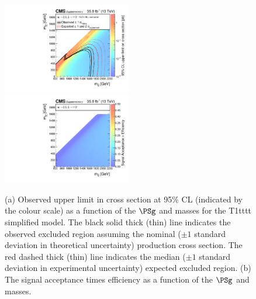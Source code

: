 \begin{figure}
    \begin{center}
            \includegraphics[width=0.50\textwidth]{Supplementary/T1ttttXSEC}
            \includegraphics[width=0.50\textwidth]{Supplementary/T1tttt_efficiency_aux}
        \caption{ (a) Observed upper limit in cross section at 95\% CL (indicated
        by the colour scale) as a function of 
        the $\PSg$ and \PSGczDo %
        masses for the 
        T1tttt %
        simplified  model.  The  black  solid thick  (thin)  line indicates  the
        observed  excluded  region  assuming   the  nominal  (${\pm}1$  standard
        deviation in theoretical uncertainty)  production cross section. The red
        dashed  thick  (thin)  line  indicates  the  median  (${\pm}1$  standard
        deviation in experimental uncertainty) expected excluded region.
        (b) The signal acceptance times efficiency as a function of 
        the $\PSg$ and \PSGczDo %
        masses.
        }
        \label{fig:T1tttt}
    \end{center}
\end{figure}

